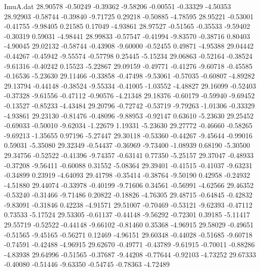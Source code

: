 \begin{filecontents}{ImuA.dat}
  28.90578   -0.50249   -0.39362   -9.58206   -0.00551   -0.33329   -4.50353
  28.92903   -0.58744   -0.39840   -9.71725    0.29218   -0.50885   -4.78595
  28.95221   -0.53001   -0.41755   -9.98405    0.21585    0.17049   -4.93861
  28.97527   -0.51565   -0.35533   -9.59402   -0.30319    0.59031   -4.98441
  28.99833   -0.57547   -0.41994   -9.83570   -0.38716    0.80403   -4.90045
  29.02132   -0.58744   -0.43908   -9.60000   -0.52455    0.49871   -4.95388
  29.04442   -0.44267   -0.45942   -9.55574   -0.57798    0.25445   -5.15234
  29.06863   -0.52164   -0.38524   -9.61316   -0.40242    0.15523   -5.22867
  29.09159   -0.49771   -0.41276   -9.60718   -0.45585   -0.16536   -5.23630
  29.11466   -0.33858   -0.47498   -9.53061   -0.57035   -0.60807   -4.89282
  29.13794   -0.44148   -0.38524   -9.55334   -0.41005   -1.03552   -4.48827
  29.16099   -0.52403   -0.37328   -9.61556   -0.47112   -0.90576   -4.21348
  29.18376   -0.60179   -0.59940   -9.69452   -0.13527   -0.85233   -4.43484
  29.20796   -0.72742   -0.53719   -9.79263   -1.01306   -0.33329   -4.93861
  29.23130   -0.81476   -0.48096   -9.88953   -0.92147    0.63610   -5.23630
  29.25452   -0.69033   -0.50010   -9.62034   -1.22679    1.19331   -5.23630
  29.27772   -0.46660   -0.58265   -9.69213   -1.35655    0.97196   -5.27447
  29.30118   -0.53360   -0.44267   -9.45644   -0.99016    0.59031   -5.35080
  29.32349   -0.54437   -0.36969   -9.73400   -1.08939    0.68190   -5.30500
  29.34756   -0.52522   -0.41396   -9.74357   -0.63141    0.77350   -5.25157
  29.37047   -0.48933   -0.37208   -9.56411   -0.60088    0.31552   -5.08364
  29.39401   -0.41515   -0.41037   -9.63231   -0.34899    0.23919   -4.64093
  29.41798   -0.35414   -0.38764   -9.50190    0.42958   -0.24932   -4.51880
  29.44074   -0.33978   -0.40199   -9.71606    0.34561   -0.56991   -4.62566
  29.46352   -0.53240   -0.31466   -9.71486    0.20822   -0.18826   -4.76305
  29.48715   -0.64845   -0.42832   -9.83091   -0.31846    0.42238   -4.91571
  29.51007   -0.70469   -0.53121   -9.62393   -0.47112    0.73533   -5.17524
  29.53305   -0.61137   -0.44148   -9.56292   -0.72301    0.39185   -5.11417
  29.55719   -0.52522   -0.44148   -9.66102   -0.81460    0.35368   -4.96915
  29.58029   -0.49651   -0.51565   -9.45165   -0.56271    0.12469   -4.96151
  29.60348   -0.44028   -0.51685   -9.60718   -0.74591   -0.42488   -4.96915
  29.62670   -0.49771   -0.43789   -9.61915   -0.70011   -0.88286   -4.83938
  29.64996   -0.51565   -0.37687   -9.44208   -0.77644   -0.92103   -4.73252
  29.67333   -0.40080   -0.51446   -9.63350   -0.54745   -0.78363   -4.72489

\end{filecontents}
